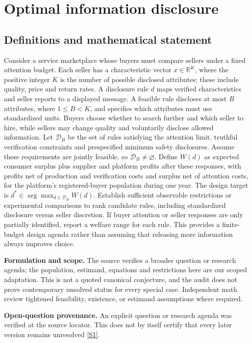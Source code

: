 \documentclass[11pt]{article}
\newcommand{\sref}[2]{\hyperlink{source:#1:#2}{[S#2]}}
\begin{document}
\section*{Optimal information disclosure}\label{30007684}
\subsection{Definitions and mathematical statement}
Consider a service marketplace whose buyers must compare sellers under a fixed attention budget. Each seller has a characteristic vector \(x\in\mathbb R^K\), where the positive integer \(K\) is the number of possible disclosed attributes; these include quality, price and return rates. A disclosure rule \(d\) maps verified characteristics and seller reports to a displayed message. A feasible rule discloses at most \(B\) attributes, where \(1\leq B<K\), and specifies which attributes must use standardized units. Buyers choose whether to search further and which seller to hire, while sellers may change quality and voluntarily disclose allowed information. Let \(\mathcal D_B\) be the set of rules satisfying the attention limit, truthful verification constraints and prespecified minimum safety disclosures. Assume these requirements are jointly feasible, so \(\mathcal D_B\neq\varnothing\). Define \(W(d)\) as expected consumer surplus plus supplier and platform profits after these responses, with profits net of production and verification costs and surplus net of attention costs, for the platform's registered-buyer population during one year. The design target is \(d^*\in\arg\max_{d\in\mathcal D_B}W(d)\). Establish sufficient observable restrictions or experimental comparisons to rank candidate rules, including standardized disclosure versus seller discretion. If buyer attention or seller responses are only partially identified, report a welfare range for each rule. This provides a finite-budget design agenda rather than assuming that releasing more information always improves choice.

\par\textbf{Formulation and scope.} The source verifies a broader question or research agenda; the population, estimand, equations and restrictions here are our scoped adaptation. This is not a quoted canonical conjecture, and the audit does not prove contemporary unsolved status for every special case. Independent math review tightened feasibility, existence, or estimand assumptions where required.

\par\textbf{Open-question provenance.} An explicit question or research agenda was verified at the source locator. This does not by itself certify that every later version remains unresolved \sref{30007684}{1}.
\end{document}
